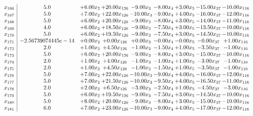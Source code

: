 \documentclass[8pt]{article}
\begin{document}
\[\begin{array}{c| c c@{\hskip 2pt} c@{\hskip 2pt} c@{\hskip 2pt} c@{\hskip 2pt} c@{\hskip 2pt} c@{\hskip 2pt} c@{\hskip 2pt} }
 x_{166}   &  5.0 & +  6.00 x_{2} & + 20.00 x_{126} & -9.00 x_{3} & -8.00 x_{4} & +  3.00 x_{5} & -15.00 x_{37} & -10.00 x_{116}\\
 x_{167}   &  5.0 & +  7.00 x_{2} & + 22.00 x_{126} & -10.00 x_{3} & -9.00 x_{4} & +  4.00 x_{5} & -16.00 x_{37} & -12.00 x_{116}\\
 x_{168}   &  5.0 & +  6.00 x_{2} & + 20.00 x_{126} & -9.00 x_{3} & -8.00 x_{4} & +  3.00 x_{5} & -14.00 x_{37} & -11.00 x_{116}\\
 x_{169}   &  4.0 & +  6.00 x_{2} & + 18.50 x_{126} & -9.00 x_{3} & -7.50 x_{4} & +  3.00 x_{5} & -13.50 x_{37} & -10.00 x_{116}\\
 x_{170}   &  5.0 & +  6.00 x_{2} & + 19.50 x_{126} & -9.00 x_{3} & -7.50 x_{4} & +  3.00 x_{5} & -14.50 x_{37} & -10.00 x_{116}\\
 x_{171}   &  -2.56739074445e-14 & +  0.00 x_{2} & +  0.00 x_{126} & +  0.00 x_{3} & -0.00 x_{4} & -0.00 x_{5} & -0.00 x_{37} & +  1.00 x_{116}\\
 x_{172}   &  2.0 & +  1.00 x_{2} & +  4.50 x_{126} & -1.00 x_{3} & -1.50 x_{4} & +  1.00 x_{5} & -3.50 x_{37} & -1.00 x_{116}\\
 x_{173}   &  5.0 & +  6.00 x_{2} & + 20.00 x_{126} & -9.00 x_{3} & -8.00 x_{4} & +  3.00 x_{5} & -15.00 x_{37} & -10.00 x_{116}\\
 x_{174}   &  2.0 & +  1.00 x_{2} & +  4.00 x_{126} & -1.00 x_{3} & -1.00 x_{4} & +  1.00 x_{5} & -3.00 x_{37} & -1.00 x_{116}\\
 x_{175}   &  2.0 & +  1.00 x_{2} & +  4.50 x_{126} & -1.00 x_{3} & -1.50 x_{4} & +  1.00 x_{5} & -3.50 x_{37} & -1.00 x_{116}\\
 x_{176}   &  5.0 & +  7.00 x_{2} & + 22.00 x_{126} & -10.00 x_{3} & -9.00 x_{4} & +  4.00 x_{5} & -16.00 x_{37} & -12.00 x_{116}\\
 x_{177}   &  5.0 & +  7.00 x_{2} & + 21.50 x_{126} & -10.00 x_{3} & -9.50 x_{4} & +  4.00 x_{5} & -16.50 x_{37} & -11.00 x_{116}\\
 x_{178}   &  2.0 & +  2.00 x_{2} & +  6.50 x_{126} & -3.00 x_{3} & -2.50 x_{4} & +  1.00 x_{5} & -4.50 x_{37} & -3.00 x_{116}\\
 x_{179}   &  5.0 & +  6.00 x_{2} & + 19.50 x_{126} & -9.00 x_{3} & -7.50 x_{4} & +  3.00 x_{5} & -14.50 x_{37} & -10.00 x_{116}\\
 x_{180}   &  5.0 & +  6.00 x_{2} & + 20.00 x_{126} & -9.00 x_{3} & -8.00 x_{4} & +  3.00 x_{5} & -15.00 x_{37} & -10.00 x_{116}\\
 x_{181}   &  6.0 & +  7.00 x_{2} & + 23.00 x_{126} & -10.00 x_{3} & -9.00 x_{4} & +  4.00 x_{5} & -17.00 x_{37} & -12.00 x_{116}\\

\end{array}\]
\end{document}
